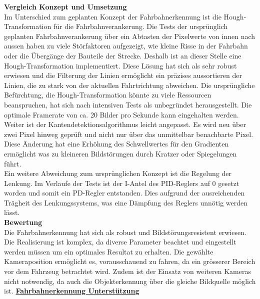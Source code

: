 \textbf{Vergleich Konzept und Umsetzung}\\[0.2cm]
Im Unterschied zum geplanten Konzept der Fahrbahnerkennung ist die Hough-Transformation für die Fahrbahnverankerung. Die Tests der ursprünglich geplanten Fahrbahnverankerung über ein Abtasten der Pixelwerte von innen nach aussen haben zu viele Störfaktoren aufgezeigt, wie kleine Risse in der Fahrbahn oder die Übergänge der Bauteile der Strecke. Deshalb ist an dieser Stelle eine Hough-Transformation implementiert. Diese Lösung hat sich als sehr robust erwiesen und die Filterung der Linien ermöglicht ein präzises aussortieren der Linien, die zu stark von der aktuellen Fahrtrichtung abweichen. Die ursprüngliche Befürchtung, die Hough-Transformation könnte zu viele Ressourcen beanspruchen, hat sich nach intensiven Tests als unbegründet herausgestellt. Die optimale Framerate von ca. 20 Bilder pro Sekunde kann eingehalten werden.\\
Weiter ist der Kantendetektionsalgorithmus leicht angepasst. Es wird neu über zwei Pixel hinweg geprüft und nicht nur über das unmittelbar benachbarte Pixel. Diese Änderung hat eine Erhöhung des Schwellwertes für den Gradienten ermöglicht was zu kleineren Bildstörungen durch Kratzer oder Spiegelungen führt.\\
Ein weitere Abweichung zum ursprünglichen Konzept ist die Regelung der Lenkung. Im Verlaufe der Tests ist der I-Antel des PID-Reglers auf 0 gesetzt worden und somit ein PD-Regler entstanden. Dies aufgrund der ausreichenden Trägheit des Lenkungssystems, was eine Dämpfung des Reglers unnötig werden lässt.\\[0.2cm]
\textbf{Bewertung}\\[0.2cm]
Die Fahrbahnerkennung hat sich als robust und Bildstörungsresistent erwiesen. Die Realisierung ist komplex, da diverse Parameter beachtet und eingestellt werden müssen um ein optimales Resultat zu erhalten. Die gewählte Kameraposition ermöglicht es, vorausschauend zu fahren, da ein grösserer Bereich vor dem Fahrzeug betrachtet wird. Zudem ist der Einsatz von weiteren Kameras nicht notwendig, da auch die Objekterkennung über die gleiche Bildquelle möglich ist.
\newpage
\underline{\textbf{Fahrbahnerkennung Unterstützung}}\\[0.2cm]
